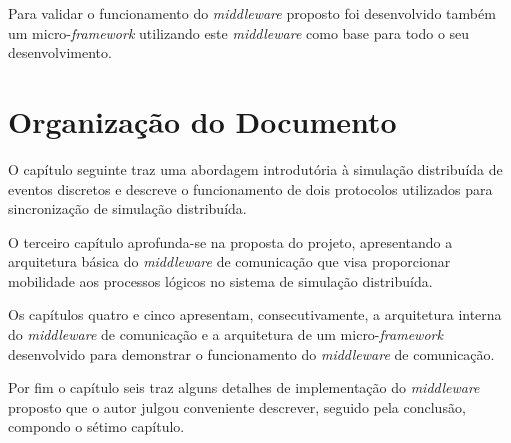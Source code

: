 Para validar o funcionamento do \textit{middleware} proposto foi desenvolvido também um micro-\textit{framework} utilizando este \textit{middleware} como base para todo o seu desenvolvimento.

\section{Organização do Documento}

O capítulo seguinte traz uma abordagem introdutória à simulação distribuída de eventos discretos e descreve o funcionamento de dois protocolos utilizados para sincronização de simulação distribuída.

O terceiro capítulo aprofunda-se na proposta do projeto, apresentando a arquitetura básica do \textit{middleware} de comunicação que visa proporcionar mobilidade aos processos lógicos no sistema de simulação distribuída. 

Os capítulos quatro e cinco apresentam, consecutivamente, a arquitetura interna do \textit{middleware} de comunicação e a arquitetura de um micro-\textit{framework} desenvolvido para demonstrar o funcionamento do \textit{middleware} de comunicação.

Por fim o capítulo seis traz alguns detalhes de implementação do \textit{middleware} proposto que o autor julgou conveniente descrever, seguido pela conclusão, compondo o sétimo capítulo.
